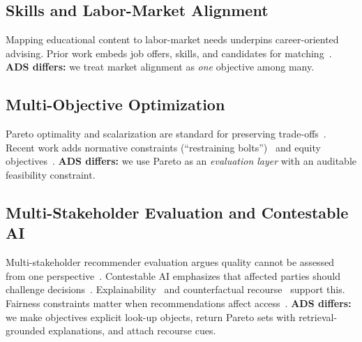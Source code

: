 \documentclass[sigconf,review]{acmart}
\begin{document}
\subsection{Skills and Labor-Market Alignment}
Mapping educational content to labor-market needs underpins career-oriented advising. Prior work embeds job offers, skills, and candidates for matching~\cite{giabelli2021skills2job,kara2022skillEmbeddings,leon2024transversalSkills}. \textbf{ADS differs:} we treat market alignment as \emph{one} objective among many.

\subsection{Multi-Objective Optimization}
Pareto optimality and scalarization are standard for preserving trade-offs~\cite{roijers2013survey_mosdm,deb2002nsga2}. Recent work adds normative constraints (``restraining bolts'')~\cite{monb2025,restrainingBolts2025} and equity objectives~\cite{equityMAMORL2025}. \textbf{ADS differs:} we use Pareto as an \emph{evaluation layer} with an auditable feasibility constraint.

\subsection{Multi-Stakeholder Evaluation and Contestable AI}
Multi-stakeholder recommender evaluation argues quality cannot be assessed from one perspective~\cite{abdollahpouri2020multistakeholder,burke2025mseval,ge2024trustworthyRS}.
Contestable AI emphasizes that affected parties should challenge decisions~\cite{aler2020contestable,alfrink2023contestable,dignum2025contesting}.
Explainability~\cite{zhang2020explainableRS} and counterfactual recourse~\cite{wachter2017counterfactual,ustun2019recourse,robustx2025} support this.
Fairness constraints matter when recommendations affect access~\cite{ekstrand2019fairness,dwork2012fairness,hardt2016equality,fairRankAgg2025,fairdas2024}.
\textbf{ADS differs:} we make objectives explicit look-up objects, return Pareto sets with retrieval-grounded explanations, and attach recourse cues.
\end{document}
